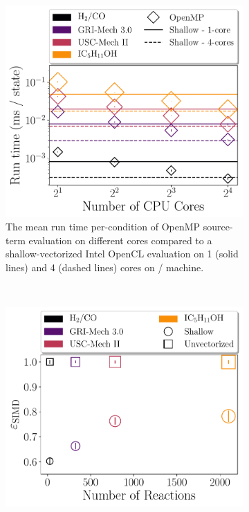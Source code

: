 \documentclass[12pt,number,sort&compress,preprint]{elsarticle}
\begin{document}
\begin{figure}[htbp]
\begin{subfigure}[t]{0.48\linewidth}
      \includegraphics[width=\textwidth]{source_crossover.pdf}
      \caption{The mean run time per-condition of OpenMP source-term evaluation on different cores compared to a shallow-vectorized Intel OpenCL evaluation on \num{1} (solid lines) and \num{4} (dashed lines) cores on \avx/ machine.}
      \label{F:source_crossover}
  \end{subfigure}
  \\
  \begin{subfigure}[t]{0.48\linewidth}
      \includegraphics[width=\textwidth]{source_simd_efficiency.pdf}

\end{subfigure}
\end{figure}
\end{document}
